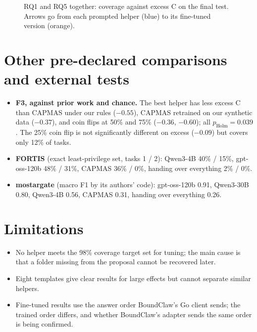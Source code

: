 \documentclass[10pt,letterpaper]{article}
\begin{document}
\begin{figure}[H]
\centering

\caption{RQ1 and RQ5 together: coverage against excess C on the final test. Arrows go from each prompted helper
(blue) to its fine-tuned version (orange).}
\end{figure}

\section*{Other pre-declared comparisons and external tests}
\begin{itemize}
  \item \textbf{F3, against prior work and chance.} The best helper has less excess C than CAPMAS under our rules
  ($-0.55$), CAPMAS retrained on our synthetic data ($-0.37$), and coin flips at 50\% and 75\% ($-0.36$, $-0.60$);
  all $p_\mathrm{Holm}=0.039$. The 25\% coin flip is not significantly different on excess ($-0.09$) but covers only
  12\% of tasks.
  \item \textbf{FORTIS} (exact least-privilege set, tasks 1 / 2): Qwen3-4B 40\% / 15\%, gpt-oss-120b 48\% / 31\%,
  CAPMAS 36\% / 0\%, handing over everything 2\% / 0\%.
  \item \textbf{mostargate} (macro F1 by its authors' code): gpt-oss-120b 0.91, Qwen3-30B 0.80, Qwen3-4B 0.56,
  CAPMAS 0.31, handing over everything 0.26.
\end{itemize}

\section*{Limitations}
\begin{itemize}
  \item No helper meets the 98\% coverage target set for tuning; the main cause is that a folder missing from the
  proposal cannot be recovered later.
  \item Eight templates give clear results for large effects but cannot separate similar helpers.
  \item Fine-tuned results use the answer order BoundClaw's Go client sends; the trained order differs, and whether
  BoundClaw's adapter sends the same order is being confirmed.
\end{itemize}
\end{document}
